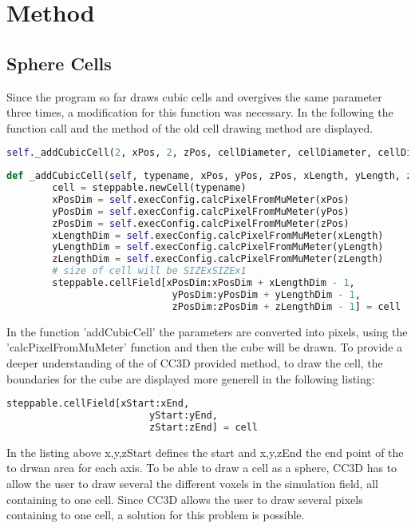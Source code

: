 \chapter{Method}
    

\section{Sphere Cells}
Since the program so far draws cubic cells and overgives the same parameter three times, a modification for this function was necessary. In the following the function call and the method of the old cell drawing method are displayed.
\begin{lstlisting}[language=Python, caption = function call of the cell drawing method addCubicCell\, which was used in the 2D simualtion]
self._addCubicCell(2, xPos, 2, zPos, cellDiameter, cellDiameter, cellDiameter, steppable)
\end{lstlisting}
\begin{lstlisting}[language=Python, caption = method to draw cubic cells]
    def _addCubicCell(self, typename, xPos, yPos, zPos, xLength, yLength, zLength, steppable):
        cell = steppable.newCell(typename)
        xPosDim = self.execConfig.calcPixelFromMuMeter(xPos)
        yPosDim = self.execConfig.calcPixelFromMuMeter(yPos)
        zPosDim = self.execConfig.calcPixelFromMuMeter(zPos)
        xLengthDim = self.execConfig.calcPixelFromMuMeter(xLength)
        yLengthDim = self.execConfig.calcPixelFromMuMeter(yLength)
        zLengthDim = self.execConfig.calcPixelFromMuMeter(zLength)
        # size of cell will be SIZExSIZEx1
        steppable.cellField[xPosDim:xPosDim + xLengthDim - 1,
        					 yPosDim:yPosDim + yLengthDim - 1,
        					 zPosDim:zPosDim + zLengthDim - 1] = cell
\end{lstlisting}
In the function 'addCubicCell' the parameters are converted into pixels, using the 'calcPixelFromMuMeter' function and then the cube will be drawn. To provide a deeper understanding of the of \ac{CC3D} provided method, to draw the cell, the boundaries for the cube are displayed more generell in the following listing:
\begin{lstlisting}[language=Python, caption = boundaries of a drawn cuboid]
    steppable.cellField[xStart:xEnd,
    					 yStart:yEnd,
    					 zStart:zEnd] = cell
\end{lstlisting}        		
In the listing above x,y,zStart defines the start and x,y,zEnd the end point of the to drwan area for each axis.\newline
To be able to draw a cell as a sphere, \ac{CC3D} has to allow the user to draw several the different voxels in the simulation field, all containing to one cell. Since \ac{CC3D} allows the user to draw several pixels containing to one cell, a solution for this problem is possible.


